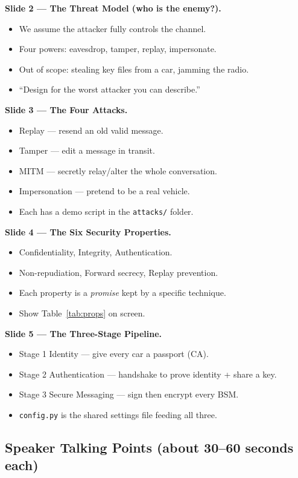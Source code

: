 \documentclass[11pt,a4paper]{article}
\begin{document}
\textbf{Slide 2 --- The Threat Model (who is the enemy?).}
\begin{itemize}
  \item We assume the attacker fully controls the channel.
  \item Four powers: eavesdrop, tamper, replay, impersonate.
  \item Out of scope: stealing key files from a car, jamming the radio.
  \item ``Design for the worst attacker you can describe.''
\end{itemize}

\textbf{Slide 3 --- The Four Attacks.}
\begin{itemize}
  \item Replay --- resend an old valid message.
  \item Tamper --- edit a message in transit.
  \item MITM --- secretly relay/alter the whole conversation.
  \item Impersonation --- pretend to be a real vehicle.
  \item Each has a demo script in the \texttt{attacks/} folder.
\end{itemize}

\textbf{Slide 4 --- The Six Security Properties.}
\begin{itemize}
  \item Confidentiality, Integrity, Authentication.
  \item Non-repudiation, Forward secrecy, Replay prevention.
  \item Each property is a \emph{promise} kept by a specific technique.
  \item Show Table~\ref{tab:props} on screen.
\end{itemize}

\textbf{Slide 5 --- The Three-Stage Pipeline.}
\begin{itemize}
  \item Stage 1 Identity --- give every car a passport (CA).
  \item Stage 2 Authentication --- handshake to prove identity + share a key.
  \item Stage 3 Secure Messaging --- sign then encrypt every BSM.
  \item \texttt{config.py} is the shared settings file feeding all three.
\end{itemize}

\subsection{Speaker Talking Points (about 30--60 seconds each)}
\end{document}
